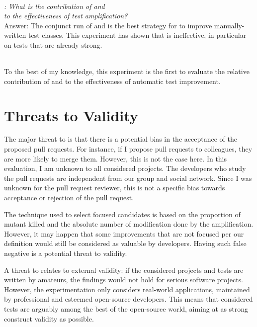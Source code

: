 ~\\

\begin{mdframed}
	\textit{\rqAmplVersusIAmpl: What is the contribution of \Iampl{} and \\\Aampl{} to the effectiveness of test amplification?}\\
	Answer: The conjunct run of \Iampl{} and \Aampl{} is the best strategy for \dspot{} to improve manually-written test classes. 
	This experiment has shown that \Aampl{} is ineffective, in particular on tests that are already strong.
\end{mdframed}
~\\

To the best of my knowledge, this experiment is the first to evaluate the relative contribution of \Iampl and \Aampl to the effectiveness of automatic test improvement.

\section{Threats to Validity}
\label{sec:test-improvement:threats}

\textbf{\rqpullrequest{}}
The major threat to \rqpullrequest is that there is a potential bias in the acceptance of the proposed pull requests.
For instance, if I propose pull requests to colleagues, they are more likely to merge them.
However, this is not the case here.
In this evaluation, I am unknown to all considered projects. 
The developers who study the \dspot pull requests are independent from our group and social network.
Since I was unknown for the pull request reviewer, this is not a specific bias towards acceptance or rejection of the pull request.

\textbf{\rqcandidates{}}
The technique used to select focused candidates is based on the proportion of mutant killed and the absolute number of modification done by the amplification. 
However, it may happen that some improvements that are not focused per our definition would still be considered as valuable by developers. 
Having such false negative is a potential threat to validity.

\textbf{\rqeffectiveness{}}
A threat to \rqeffectiveness{} relates to external validity: if the considered projects and tests are written by amateurs, the findings would not hold for serious software projects.
However, the experimentation only considers real-world applications, maintained by professional and esteemed open-source developers.
This means that considered tests are arguably among the best of the open-source world, aiming at as strong construct validity as possible.

